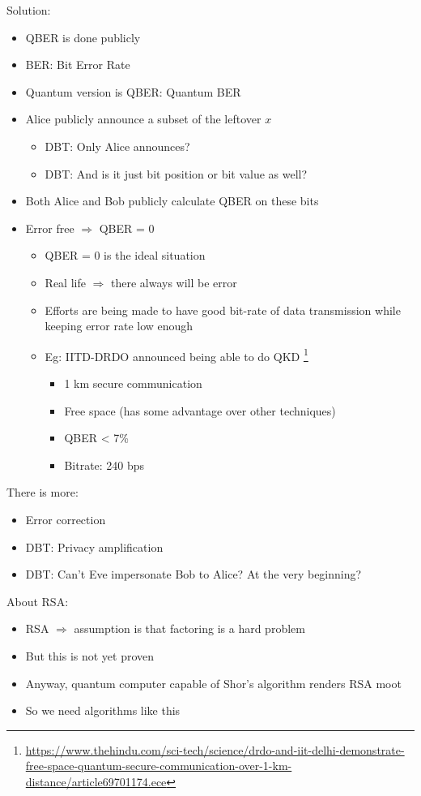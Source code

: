 \documentclass[12pt]{article}
\begin{document}
Solution:
\begin{itemize}
\item QBER is done publicly
\item BER: Bit Error Rate
\item Quantum version is QBER: Quantum BER
\item Alice publicly announce a subset of the leftover $x$
  \begin{itemize}
  \item DBT: Only Alice announces?
  \item DBT: And is it just bit position or bit value as well?
  \end{itemize}
\item Both Alice and Bob publicly calculate QBER on these bits
\item Error free $\Rightarrow$ QBER = 0 
  \begin{itemize}
  \item QBER = 0 is the ideal situation
  \item Real life $\Rightarrow$ there always will be error
  \item Efforts are being made to have good bit-rate of data
    transmission while keeping error rate low enough
  \item Eg: IITD-DRDO announced being able to do QKD
    \footnote{\url{https://www.thehindu.com/sci-tech/science/drdo-and-iit-delhi-demonstrate-free-space-quantum-secure-communication-over-1-km-distance/article69701174.ece}}
    \begin{itemize}
    \item 1 km secure communication
    \item Free space (has some advantage over other techniques)
    \item QBER < 7\%
    \item Bitrate: 240 bps 
    \end{itemize}
  \end{itemize}
\end{itemize}

There is more:
\begin{itemize}
\item Error correction
\item DBT: Privacy amplification
\item DBT: Can't Eve impersonate Bob to Alice? At the very beginning? 
\end{itemize}

About RSA:
\begin{itemize}
\item RSA $\Rightarrow$ assumption is that factoring is a hard problem
\item But this is not yet proven
\item Anyway, quantum computer capable of Shor's algorithm renders RSA moot
\item So we need algorithms like this
\end{itemize}
\end{document}

